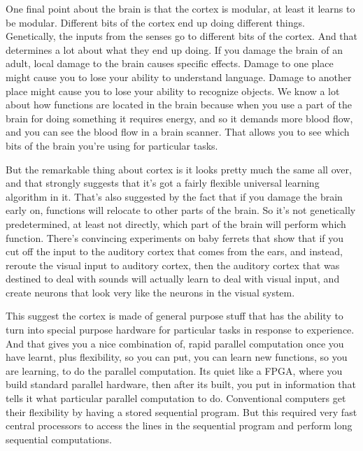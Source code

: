 \begin{multicols}{2}
\begin{footnotesize}
One final point about the brain is that the cortex is modular, at least it learns to be modular. Different bits of the cortex end up doing different things. Genetically, the inputs from the senses go to different bits of the cortex. And that determines a lot about what they end up doing. If you damage the brain of an adult, local damage to the brain causes specific effects. Damage to one place might cause you to lose your ability to understand language. Damage to another place might cause you to lose your ability to recognize objects. We know a lot about how functions are located in the brain because when you use a part of the brain for doing something it requires energy, and so it demands more blood flow, and you can see the blood flow in a brain scanner. That allows you to see which bits of the brain you're using for particular tasks.

But the remarkable thing about cortex is it looks pretty much the same all over, and that strongly suggests that it's got a fairly flexible universal learning algorithm in it. That's also suggested by the fact that if you damage the brain early on, functions will relocate to other parts of the brain. So it's not genetically predetermined, at least not directly, which part of the brain will perform which function. There's convincing experiments on baby ferrets that show that if you cut off the input to the auditory cortex that comes from the ears, and instead, reroute the visual input to auditory cortex, then the auditory cortex that was destined to deal with sounds will actually learn to deal with visual input, and create neurons that look very like the neurons in the visual system. 

This suggest the cortex is made of general purpose stuff that has the ability to turn into special purpose hardware for particular tasks in response to experience. And that gives you a nice combination of, rapid parallel computation once you have learnt, plus flexibility, so you can put, you can learn new functions, so you are learning, to do the parallel computation. Its quiet like a FPGA, where you build standard parallel hardware, then after its built, you put in information that tells it what particular parallel computation to do. Conventional computers get their flexibility by having a stored sequential program. But this required very fast central processors to access the lines in the sequential program and perform long sequential computations. 
\end{footnotesize}
\end{multicols}


